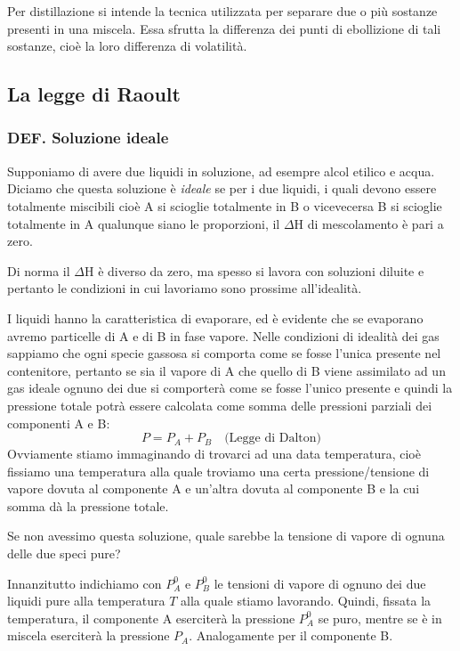 Per distillazione si intende la tecnica utilizzata per separare due o più sostanze presenti in una miscela. Essa sfrutta la differenza dei punti di ebollizione di tali sostanze, cioè la loro differenza di volatilità.
\subsection{La legge di Raoult}
\subsubsection{DEF. Soluzione ideale}
Supponiamo di avere due liquidi in soluzione, ad esempre alcol etilico e acqua. Diciamo che questa soluzione è \textit{ideale} se per i due liquidi, i quali devono essere totalmente miscibili cioè A si scioglie totalmente in B o vicevecersa B si scioglie totalmente in A qualunque siano le proporzioni, il $\Delta$H di mescolamento è pari a zero.

Di norma il $\Delta$H è diverso da zero, ma spesso si lavora con soluzioni diluite e pertanto le condizioni in cui lavoriamo sono prossime all'idealità.

\vspace{0.2cm}I liquidi hanno la caratteristica di evaporare, ed è evidente che se evaporano avremo particelle di A e di B in fase vapore. Nelle condizioni di idealità dei gas sappiamo che ogni specie gassosa si comporta come se fosse l'unica presente nel contenitore, pertanto se sia il vapore di A che quello di B viene assimilato ad un gas ideale ognuno dei due si comporterà come se fosse l'unico presente e quindi la pressione totale potrà essere calcolata come somma delle pressioni parziali dei componenti A e B:
$$P=P_A + P_B \quad \text{(Legge di Dalton)}$$
Ovviamente stiamo immaginando di trovarci ad una data temperatura, cioè fissiamo una temperatura alla quale troviamo una certa pressione/tensione di vapore dovuta al componente A e un'altra dovuta al componente B e la cui somma dà la pressione totale.

Se non avessimo questa soluzione, quale sarebbe la tensione di vapore di ognuna delle due speci pure? 

Innanzitutto indichiamo con $P^0_A$ e $P^0_B$ le tensioni di vapore di ognuno dei due liquidi pure alla temperatura $T$ alla quale stiamo lavorando. Quindi, fissata la temperatura, il componente A eserciterà la pressione $P^0_A$ se puro, mentre se è in miscela eserciterà la pressione $P_A$. Analogamente per il componente B.

